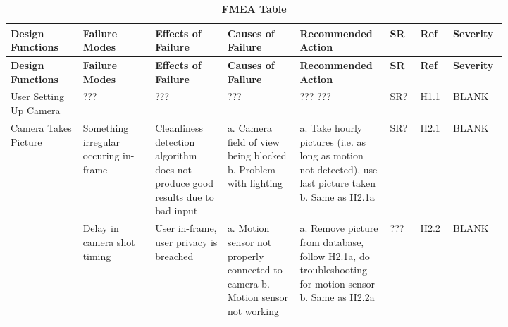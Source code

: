 \documentclass{article}
\begin{document}
\begin{longtable}{|>{\raggedright\arraybackslash}p{0.13\linewidth} | >{\raggedright\arraybackslash}p{0.13\linewidth} | >{\raggedright\arraybackslash}p{0.13\linewidth}| >{\raggedright\arraybackslash}p{0.13\linewidth}| >{\raggedright\arraybackslash}p{0.13\linewidth}| >{\raggedright\arraybackslash}p{0.05\linewidth}| >{\raggedright\arraybackslash}p{0.05\linewidth}| >{\raggedright\arraybackslash}p{0.07\linewidth}|}
    \caption{\bf FMEA Table} \label{tab:my_label} \\
    
    \hline
    \textbf{Design Functions} & \textbf{Failure Modes} & \textbf{Effects of Failure} & \textbf{Causes of Failure} & \textbf{Recommended Action} & \textbf{SR} & \textbf{Ref} & \textbf{Severity}\\
    \hline
    \endfirsthead
    
    \hline
    \textbf{Design Functions} & \textbf{Failure Modes} & \textbf{Effects of Failure} & \textbf{Causes of Failure} & \textbf{Recommended Action} & \textbf{SR} & \textbf{Ref} & \textbf{Severity}\\
    \hline
    \endhead
    
    \hline
    \endfoot
    
    \hline
    \endlastfoot
    
    User Setting Up Camera & ??? \newline & ???\newline & ???  \newline & ??? \newline???  \newline & SR?  \newline & H1.1  \newline & BLANK\\


    \hline
    Camera Takes Picture & Something irregular occuring in-frame \newline & Cleanliness detection algorithm does not produce good results due to bad input\newline & a. Camera field of view being blocked \newline b. Problem with lighting  \newline & a. Take hourly pictures (i.e. as long as motion not detected), use last picture taken \newline b. Same as H2.1a  \newline & SR?  \newline & H2.1  \newline & BLANK\\
    & Delay in camera shot timing & User in-frame, user privacy is breached & a. Motion sensor not properly connected to camera  \newline b. Motion sensor not working &  a. Remove picture from database, follow H2.1a, do troubleshooting for motion sensor \newline b. Same as H2.2a \newline & ??? & H2.2 & BLANK\\
    

\end{longtable}
\end{document}
